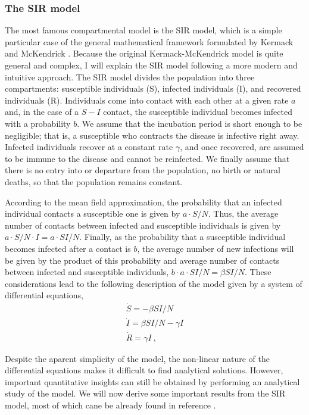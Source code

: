 \subsubsection*{\label{sec:The SIR model} The SIR model}

The most famous compartmental model is the SIR model, which is a simple
particular case of the general mathematical framework formulated by Kermack and
McKendrick \cite{McKendrick}. Because the original Kermack-McKendrick model
is quite general and complex, I will explain the SIR model following a more
modern and intuitive approach. The SIR model divides the population into three
compartments: susceptible individuals (S), infected individuals (I), and
recovered individuals (R). Individuals come into contact with each other at a
given rate $a$ and, in the case of a $S-I$ contact, the susceptible individual
becomes infected with a probability $b$. We assume that the incubation period
is short enough to be negligible; that is, a susceptible who contracts the
disease is infective right away. Infected individuals recover at a constant
rate $\gamma$, and once recovered, are assumed to be immune to the disease and
cannot be reinfected. We finally assume that there is no entry into or
departure from the population, no birth or natural deaths, so that
the population remains constant.

According to the mean field approximation, the probability that an infected
individual contacts a susceptible one is given by $a\cdot S/N$. Thus, the
average number of contacts between infected and susceptible individuals is
given by $a\cdot S/N\cdot I=a\cdot SI/N$. Finally, as the probability that a
susceptible individual becomes infected after a contact is $b$, the average
number of new infections will be given by the product of this probability and
average number of contacts between infected and susceptible individuals,
$b\cdot a\cdot SI/N=\beta SI/N$. These considerations lead to the following
description of the model given by a system of differential equations,
\begin{equation}\label{eq: normal_SIR_theo}
  \begin{array}{l}
    \dot{S}=-\beta SI/N          \\
    \dot{I}=\beta SI/N -\gamma I \\
    \dot{R}=\gamma I \ ,
  \end{array}
\end{equation}

Despite the aparent simplicity of the model, the non-linear nature of the
differential equations makes it difficult to find analytical solutions.
However, important quantitative insights can still be obtained by performing an
analytical study of the model. We will now derive some important results from
the SIR model, most of which cane be already found in reference
\cite{Murray_book}.

